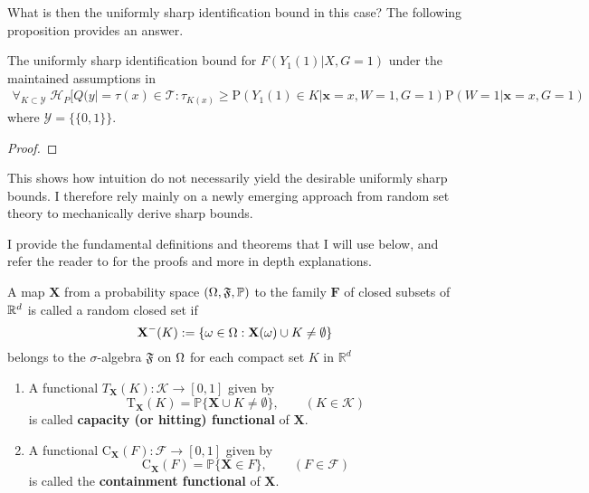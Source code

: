 \documentclass{article}
\begin{document}
What is then the uniformly sharp identification bound in this case? The following proposition provides an answer.
\begin{proposition}
    The uniformly sharp identification bound for $ F(Y_1(1) |  X, G=1)$ under the maintained assumptions in \cite{athey2020combining} 
    \begin{align*}
        \forall_{K\subset\mathcal{Y}}\;\mathcal{H}_P[ Q(y |   =  \tau(x) \in \mathcal{T} : \tau_{K(x)} \geq \mathrm{P}( Y_1(1) \in K | \mathbf{x}=x, W=1,G=1) \mathrm{P}(W =1 | \mathbf{x} = x, G=1)
    \end{align*}
    where $\mathcal{Y}= \{ \{0,1\} \}$.
\end{proposition}
\begin{proof}
    
\end{proof}


This shows how intuition do not necessarily yield the desirable uniformly sharp bounds. I therefore rely mainly on a newly emerging approach from random set theory \cite{molchanov2005theory} to mechanically derive sharp bounds.


I provide the fundamental definitions and theorems that I will use below, and refer the reader to \cite{molchanov2005theory,molchanov2018random} for the proofs and more in depth explanations.
\begin{definition}
    A map $\mathbf{X}$ from a probability space $( \Omega,\mathfrak{F},\mathbb{P} ) $ to the family $\mathbf{F} $ of closed subsets of $ \mathbb{R}^d $ is called a random closed set if 
    \begin{equation}
        \mathbf{ X}^-(K) := \{ \omega \in \Omega : \mathbf{X} (\omega) \cup K \neq \emptyset \}     
    \end{equation}
    belongs to the $\sigma $-algebra $\mathfrak{F} $ on $\Omega$ for each compact set $K$ in $\mathbb{R}^d$
\end{definition}

\begin{definition}\mbox{}
    \begin{enumerate}[1.]
        \item A functional $T_\mathbf{X}( K) : \mathcal{K}  \to [0,1] $ given by 
        \begin{equation}
            \mathrm{T}_{\mathbf{X}}( K) = \mathbb{P} \{ \mathbf{X} \cup K \neq \emptyset \},\qquad (K \in \mathcal{K} )
        \end{equation}
        is called \textbf{capacity (or hitting) functional} of $\mathbf{X}$.
        \item A functional $\mathrm{C}_\mathbf{X}(F) : \mathcal{F} \to [0,1] $ given by
        \begin{equation}
            \mathrm{C}_\mathbf{X}(F) = \mathbb{P}\{ \mathbf{X} \in F\},\qquad (F \in \mathcal{F})
        \end{equation} 
        is called the \textbf{containment functional} of $\mathbf{X}$.
    \end{enumerate}
\end{definition}
\end{document}

